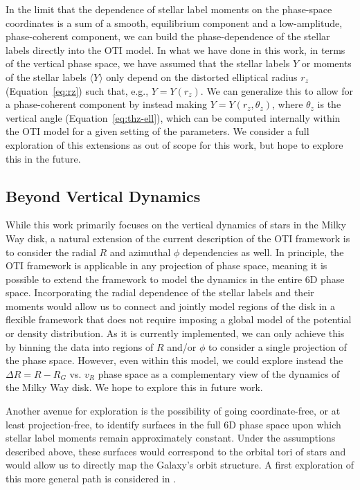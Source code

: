 \documentclass[modern]{aastex631}
\newcommand{\rz}{\ensuremath{r_z}}
\begin{document}
In the limit that the dependence of stellar label moments on the phase-space coordinates
is a sum of a smooth, equilibrium component and a low-amplitude, phase-coherent
component, we can build the phase-dependence of the stellar labels directly into the OTI
model.
In what we have done in this work, in terms of the vertical phase space, we have assumed
that the stellar labels $Y$ or moments of the stellar labels $\langle Y \rangle$ only
depend on the distorted elliptical radius $\rz$ (Equation~\ref{eq:rz}) such that, e.g.,
$Y = Y(\rz)$.
We can generalize this to allow for a phase-coherent component by instead making $Y =
Y(\rz, \theta_z)$, where $\theta_z$ is the vertical angle (Equation~\ref{eq:thz-ell}),
which can be computed internally within the OTI model for a given setting of the
parameters.
We consider a full exploration of this extensions as out of scope for this work, but
hope to explore this in the future.


\subsection{Beyond Vertical Dynamics} \label{sec:disc-beyond-vertical}

While this work primarily focuses on the vertical dynamics of stars in the Milky Way
disk, a natural extension of the current description of the OTI framework is to consider
the radial $R$ and azimuthal $\phi$ dependencies as well.
In principle, the OTI framework is applicable in any projection of phase space, meaning
it is possible to extend the framework to model the dynamics in the entire 6D phase
space.
Incorporating the radial dependence of the stellar labels and their moments would allow
us to connect and jointly model regions of the disk in a flexible framework that does
not require imposing a global model of the potential or density distribution.
As it is currently implemented, we can only achieve this by binning the data into
regions of $R$ and/or $\phi$ to consider a single projection of the phase space.
However, even within this model, we could explore instead the $\Delta R = R - R_G$ vs.
$v_R$ phase space as a complementary view of the dynamics of the Milky Way disk. We hope
to explore this in future work.

Another avenue for exploration is the possibility of going coordinate-free, or at least
projection-free, to identify surfaces in the full 6D phase space upon which stellar
label moments remain approximately constant.
Under the assumptions described above, these surfaces would correspond to the orbital
tori of stars and would allow us to directly map the Galaxy's orbit structure.
A first exploration of this more general path is considered in \cite{Novara:inprep}.
\end{document}
